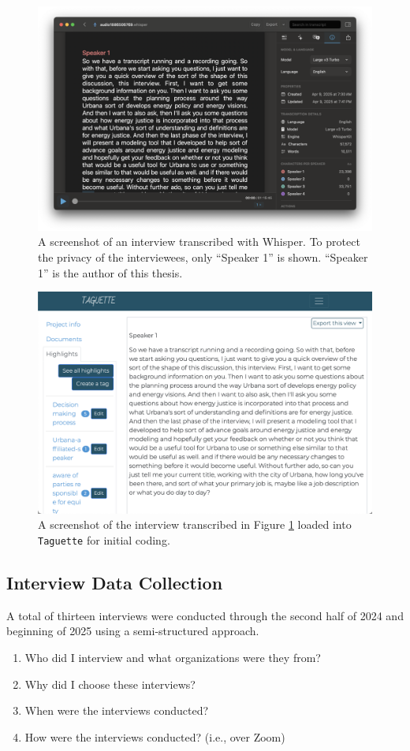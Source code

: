 \begin{figure}
    \centering
    \includegraphics[width=0.6\columnwidth]{figures/07_interview_chapter/whisper-screenshot.png}
    \caption{A screenshot of an interview transcribed with Whisper. To protect
    the privacy of the interviewees, only ``Speaker 1'' is shown. ``Speaker 1''
    is the author of this thesis.}
    \label{fig:whisper}
\end{figure}

\begin{figure}
    \centering
    \includegraphics[width=0.6\columnwidth]{figures/07_interview_chapter/taguette-screenshot}
    \caption{A screenshot of the interview transcribed in Figure \ref{fig:whisper}
    loaded into \texttt{Taguette} for initial coding.}
    \label{fig:taguette}
\end{figure}

\subsection{Interview Data Collection}

A total of thirteen interviews were conducted through the second half of 2024 and 
beginning of 2025 using a semi-structured approach.

\begin{enumerate}
    \item Who did I interview and what organizations were they from?
    \item Why did I choose these interviews?
    \item When were the interviews conducted?
    \item How were the interviews conducted? (i.e., over Zoom)
\end{enumerate}

